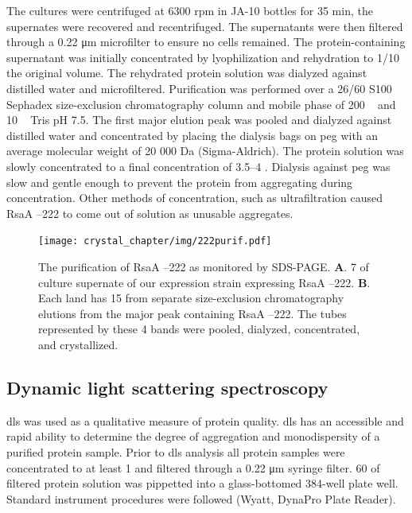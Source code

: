  The cultures were centrifuged at 6300 rpm in JA-10 bottles for
35 min, the supernates were recovered and recentrifuged. The
supernatants were then filtered through a 0.22 \si{\micro\meter} microfilter to ensure
no cells remained. The protein-containing supernatant was initially
concentrated by lyophilization and rehydration to 1/10 the original
volume. The rehydrated protein solution was dialyzed against distilled
water and microfiltered. Purification was performed over a 26/60 S100
Sephadex size-exclusion chromatography column and mobile phase of 200 \si{\milli\molar}  and 10 \si{\milli\molar}
Tris pH 7.5. The first major elution peak was pooled and dialyzed
against distilled water and concentrated by placing the dialysis bags on
\ac{peg} with an average molecular weight of 20 000 Da (Sigma-Aldrich). The protein
solution was slowly concentrated to a final concentration of 3.5--4
\mgperml. Dialysis against \ac{peg} was slow and gentle enough to prevent the
protein from aggregating during concentration. Other methods of concentration,
such as ultrafiltration caused RsaA --222 to come out of solution as unusable aggregates.

\begin{figure}[htb]
  	\begin{center}
   		\texttt{[image: crystal\_chapter/img/222purif.pdf]}
   	\end{center}
   	\caption[Purification of RsaA --222 shown by \ac{SDS-PAGE}]{
      The purification of RsaA --222 as monitored by \ac{SDS-PAGE}.
      \textbf{A}. 7 \microlitre{} of culture supernate of our \caulobacter{}
      expression strain expressing RsaA --222. \textbf{B}. Each land has
      15 \microlitre{} from separate  size-exclusion chromatography elutions
      from the major peak containing RsaA --222. The tubes represented by
      these 4 bands were pooled, dialyzed, concentrated, and crystallized.
}
   	\label{fig:222purif}
\end{figure}   

\subsection{Dynamic light scattering spectroscopy}\label{dls}

\ac{dls} was used as a qualitative measure of protein quality. \Ac{dls}  has an accessible and rapid ability to determine the degree of aggregation and monodispersity of a purified protein sample. Prior to \ac{dls} analysis all protein samples were concentrated to at least 1 \mgperml and filtered through a 0.22 \si{\micro\meter} syringe filter. 60 \microlitre of filtered protein solution was pippetted into a glass-bottomed 384-well plate well. Standard instrument procedures were followed (Wyatt, DynaPro Plate Reader\texttrademark{}). 

